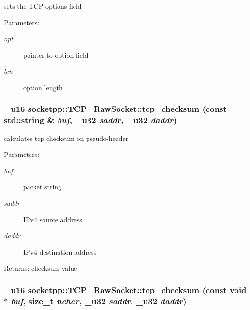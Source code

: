 sets the TCP options field 

\begin{Desc}
\item[Parameters:]
\begin{description}
\item[{\em opt}]pointer to option field \item[{\em len}]option length \end{description}
\end{Desc}
\hypertarget{classsocketpp_1_1TCP__RawSocket_59a27cc258c1007b2f7e68428fd50f80}{
\subsubsection[{tcp\_\-checksum}]{\setlength{\rightskip}{0pt plus 5cm}\_\-u16 socketpp::TCP\_\-RawSocket::tcp\_\-checksum (const std::string \& {\em buf}, \/  \_\-u32 {\em saddr}, \/  \_\-u32 {\em daddr})}}
\label{classsocketpp_1_1TCP__RawSocket_59a27cc258c1007b2f7e68428fd50f80}


calculates tcp checksum on pseudo-header 

\begin{Desc}
\item[Parameters:]
\begin{description}
\item[{\em buf}]packet string \item[{\em saddr}]IPv4 source address \item[{\em daddr}]IPv4 destination address \end{description}
\end{Desc}
\begin{Desc}
\item[Returns:]checksum value \end{Desc}
\hypertarget{classsocketpp_1_1TCP__RawSocket_d0b16fff831e7e756a127cc47de4b9aa}{
\subsubsection[{tcp\_\-checksum}]{\setlength{\rightskip}{0pt plus 5cm}\_\-u16 socketpp::TCP\_\-RawSocket::tcp\_\-checksum (const void $\ast$ {\em buf}, \/  size\_\-t {\em nchar}, \/  \_\-u32 {\em saddr}, \/  \_\-u32 {\em daddr})}}
\label{classsocketpp_1_1TCP__RawSocket_d0b16fff831e7e756a127cc47de4b9aa}


